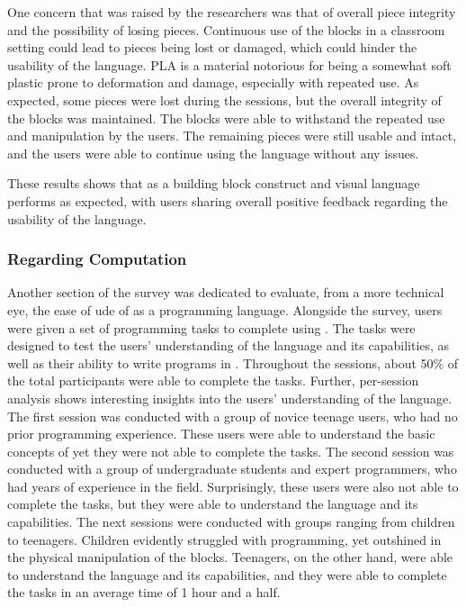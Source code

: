 One concern that was raised by the researchers was that of overall piece integrity and the possibility of losing pieces.
Continuous use of the blocks in a classroom setting could lead to pieces being lost or damaged, which could hinder the usability of the language.
PLA is a material notorious for being a somewhat soft plastic prone to deformation and damage, especially with repeated use.
As expected, some pieces were lost during the sessions, but the overall integrity of the blocks was maintained.
The blocks were able to withstand the repeated use and manipulation by the users. The remaining pieces were still usable and intact, and the users were able to continue using the language without any issues.

These results shows that \sculpt as a building block construct and visual language performs as expected, with users sharing overall positive feedback regarding the usability of the language.

\subsubsection{Regarding Computation}
\label{sec:results:validation:computation}

Another section of the survey was dedicated to evaluate, from a more technical eye, the ease of ude of \sculpt as a programming language.
Alongside the survey, users were given a set of programming tasks to complete using \sculpt.
The tasks were designed to test the users' understanding of the language and its capabilities, as well as their ability to write programs in \sculpt.
Throughout the sessions, about 50\% of the total participants were able to complete the tasks.
Further, per-session analysis shows interesting insights into the users' understanding of the language.
The first session was conducted with a group of novice teenage users, who had no prior programming experience.
These users were able to understand the basic concepts of \sculpt yet they were not able to complete the tasks.
The second session was conducted with a group of undergraduate students and expert programmers, who had years of experience in the field.
Surprisingly, these users were also not able to complete the tasks, but they were able to understand the language and its capabilities.
The next sessions were conducted with groups ranging from children to teenagers. Children evidently struggled with programming, yet outshined in the physical manipulation of the blocks.
Teenagers, on the other hand, were able to understand the language and its capabilities, and they were able to complete the tasks in an average time of 1 hour and a half.

